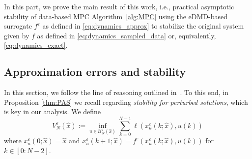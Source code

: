 \documentclass{article}
\numberwithin{equation}{section}
\newcommand{\calU}{\mathcal U}
\begin{document}
	In this part, we prove the main result of this work, i.e., practical asymptotic stability of data-based MPC Algorithm~\ref{alg:MPC} using the eDMD-based surrogate $f^\varepsilon$ as defined in \eqref{eq:dynamics_approx} to stabilize the original system given by $f$ as defined in \eqref{eq:dynamics_sampled_data} or, equivalently, \eqref{eq:dynamics_exact}.
	
	
	
	\subsection{%
		Approximation errors and stability}
	
	In this section, we follow 
	the line of reasoning outlined in~\cite[Section~11.5]{GrunPann17}. To this end, in Proposition \ref{thm:PAS} we recall \cite[Theorem 11.10]{GrunPann17} regarding \emph{stability for perturbed solutions}, which is key in our analysis. We define
	$$
	V^\varepsilon_N(\hat{x}) := \inf_{u \in \calU_N^\varepsilon(\hat{x})}\sum_{k=0}^{N - 1} \ell(x^\varepsilon_u(k;\hat{x}),u(k))
	$$
	where $x_u^\varepsilon(0;\hat{x}) = \hat{x}$ and $x_u^\varepsilon(k+1;\hat{x}) = f^\varepsilon(x_u^\varepsilon(k;\hat{x}),u(k))$ for $k\in [0:N-2]$.
\end{document}
